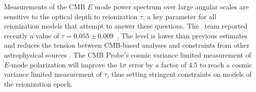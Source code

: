 Measurements of the \ac{CMB} $E$ mode power spectrum over large angular scales are sensitive to the optical depth 
to reionization $\tau$, a key parameter for all reionization models that attempt to answer these questions. 
The \planck\ team  reported recently a value of $\tau=0.055 \pm 0.009$~\cite{planck2016_xlvi,planck2016_xxxi}.
The level is lower than previous estimates and reduces the tension between CMB-based analyses and constraints from 
other astrophysical sources \cite{Robertson:2015uda}.  
The CMB Probe's cosmic variance limited measurement of $E$-mode polarization will 
improve the $1\sigma$ error by a factor of 4.5 to reach a cosmic 
variance limited measurement of $\tau$, thus setting 
stringent constraints on models of the reionization epoch. 



